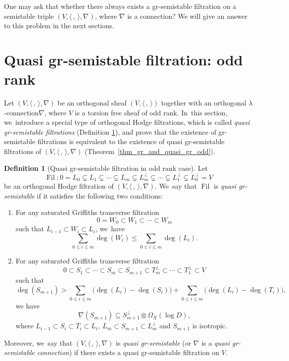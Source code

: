\documentclass[JEP,XML,SOM,Unicode,published]{cedram}
\newcommand{\lconnection}{$\lambda$\nobreakdash-con\-nec\-tion\xspace}
\newcommand{\grsemistable}{gr\nobreakdash-semi\-stable\xspace}
\DeclareMathOperator{\Filt}{Fil}
\theoremstyle{plain}
\theoremstyle{definition}
\newtheorem{defn}[thm]{Definition}
\begin{document}
One may ask that whether there always exists a \grsemistable filtration on a semistable triple $(V, \langle \,,\, \rangle,\nabla)$, where $\nabla$ is a connection? We will give an answer to this problem in the next sections.

\section{Quasi \texorpdfstring{\protect\grsemistable}{grsemistable} filtration: odd rank}\label{sect_odd}

Let $(V, \langle \,, \, \rangle, \nabla)$ be an orthogonal sheaf $(V, \langle \,, \, \rangle)$ together with an orthogonal \lconnection $\nabla$, where $V$ is a torsion free sheaf of odd rank. In~this section, we~introduce a special type of orthogonal Hodge filtrations, which is called \emph{quasi \grsemistable filtrations} (Definition \ref{defn_gr_semi_odd}), and prove that the existence of \grsemistable filtrations is equivalent to the existence of quasi \grsemistable filtrations of $(V, \langle \,, \, \rangle, \nabla)$ (Theorem~\ref{thm_gr_and_quasi_gr_odd}).


\begin{defn}[{Quasi \grsemistable filtration in odd rank case}]\label{defn_gr_semi_odd}
Let
\[
\Filt: 0= L_0 \subsetneq L_1 \subsetneq \cdots \subsetneq L_m \subsetneq L_m^\perp\subsetneq\cdots \subsetneq L_1^\perp\subsetneq L_0^\perp= V
\]
be an orthogonal Hodge filtration of $(V, \langle \,, \, \rangle, \nabla)$. We~say that $\Filt$ is \emph{quasi \grsemistable} if it satisfies the following two conditions:

\begin{enumerate}\renewcommand{\theenumi}{\Roman{enumi}}
\item\label{cond:I}
For any saturated Griffiths transverse filtration
\[
0=W_0\subset W_1 \subset \cdots\subset W_m
\]
such that $L_{i-1}\subset W_i\subset L_i$, we~have
\[
\sum_{0\leq i\leq m}\deg(W_i)\leqslant\sum_{0\leq i\leq m}\deg(L_i).
\]

\item\label{cond:II}
For any saturated Griffiths transverse filtration
\[
0\subset S_1 \subset \cdots\subset S_m\subset S_{m+1}\subset T_m^\perp\subset\cdots \subset T_1^\perp\subset V
\]
such that
\[
\deg(S_{m+1})>\sum_{0\leq i\leq m}\big(\deg(L_i)-\deg(S_i)\big)+\sum_{0\leq i\leq m}\big(\deg(L_i)-\deg(T_i)\big),
\]
we have
\[
\nabla(S_{m+1})\subseteq S_{m+1}^\perp \otimes\Omega_X(\log D),
\]
where $L_{i-1}\subset S_i \subset T_i \subset L_i,\ L_m\subset S_{m+1}\subset L_m^\perp$ and $S_{m+1}$ is isotropic.
\end{enumerate}
Moreover, we~say that $(V,\langle \,, \, \rangle,\nabla)$ is \emph{quasi \grsemistable} (or $\nabla$ is a \emph{quasi \grsemistable connection}) if there exists a quasi \grsemistable filtration on $V$.
\end{defn}
\end{document}
